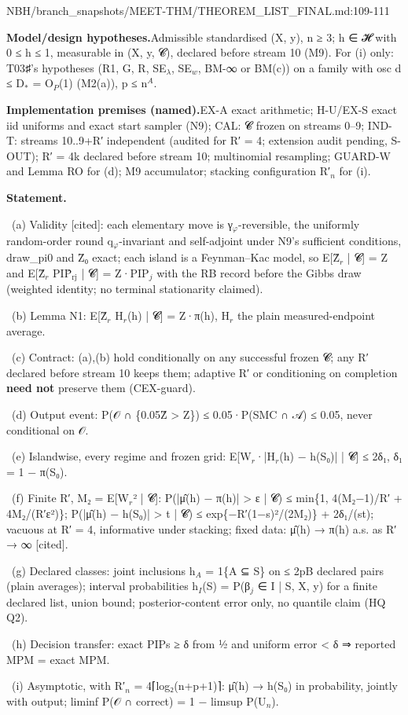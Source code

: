 \begin{stmt}{NBH/branch_snapshots/MEET-THM/THEOREM_LIST_FINAL.md:109-111}
\par\smallskip\noindent\textbf{Model/design hypotheses.}\enspace Admissible standardised (X, y), n ≥ 3; h ∈ 𝓗 with 0 ≤ h ≤ 1, measurable in (X, y, 𝓒), declared before stream 10 (M9). For (i) only: T03♯'s hypotheses (R1, G, R, SE$_{λ}$, SE$_{w}$, BM-∞ or BM(c)) on a family with osc d ≤ D$_{*}$ = O$_{P}$(1) (M2(a)), p ≤ n$^{A}$.
\par\smallskip\noindent\textbf{Implementation premises (named).}\enspace EX-A exact arithmetic; H-U/EX-S exact iid uniforms and exact start sampler (N9); CAL: 𝓒 frozen on streams 0–9; IND-T: streams 10..9+R′ independent (audited for R′ = 4; extension audit pending, S-OUT); R′ = 4k declared before stream 10; multinomial resampling; GUARD-W and Lemma RO for (d); M9 accumulator; stacking configuration R′$_{n}$ for (i).
\par\smallskip\noindent\textbf{Statement.}\enspace \par {}\ (a) Validity [cited]: each elementary move is γ$_{φ}$-reversible, the uniformly random-order round q$_{φ}$-invariant and self-adjoint under N9's sufficient conditions, draw\_pi0 and Z̄₀ exact; each island is a Feynman–Kac model, so E[Ẑ$_{r}$ | 𝓒] = Z and E[Ẑ$_{r}$ PIP̂$_{\mathrm{rj}}$ | 𝓒] = Z·PIP$_{j}$ with the RB record before the Gibbs draw (weighted identity; no terminal stationarity claimed). \par {}\ (b) Lemma N1: E[Ẑ$_{r}$ H$_{r}$(h) | 𝓒] = Z·π(h), H$_{r}$ the plain measured-endpoint average. \par {}\ (c) Contract: (a),(b) hold conditionally on any successful frozen 𝓒; any R′ declared before stream 10 keeps them; adaptive R′ or conditioning on completion \textbf{need not} preserve them (CEX-guard). \par {}\ (d) Output event: P(𝒪 ∩ \{0.05Ẑ \textgreater{} Z\}) ≤ 0.05·P(SMC ∩ 𝒜) ≤ 0.05, never conditional on 𝒪. \par {}\ (e) Islandwise, every regime and frozen grid: E[W$_{r}$·|H$_{r}$(h) − h(S₀)| | 𝓒] ≤ 2δ₁, δ₁ = 1 − π(S₀). \par {}\ (f) Finite R′, M₂ = E[W$_{r}$² | 𝓒]: P(|μ̂(h) − π(h)| \textgreater{} ε | 𝓒) ≤ min\{1, 4(M₂−1)/R′ + 4M₂/(R′ε²)\}; P(|μ̂(h) − h(S₀)| \textgreater{} t | 𝓒) ≤ exp\{−R′(1−s)²/(2M₂)\} + 2δ₁/(st); vacuous at R′ = 4, informative under stacking; fixed data: μ̂(h) → π(h) a.s. as R′ → ∞ [cited]. \par {}\ (g) Declared classes: joint inclusions h$_{A}$ = 1\{A ⊆ S\} on ≤ 2pB declared pairs (plain averages); interval probabilities h$_{I}$(S) = P(β$_{j}$ ∈ I | S, X, y) for a finite declared list, union bound; posterior-content error only, no quantile claim (HQ Q2). \par {}\ (h) Decision transfer: exact PIPs ≥ δ from ½ and uniform error \textless{} δ ⇒ reported MPM = exact MPM. \par {}\ (i) Asymptotic, with R′$_{n}$ = 4⌈log₂(n+p+1)⌉: μ̂(h) → h(S₀) in probability, jointly with output; liminf P(𝒪 ∩ correct) = 1 − limsup P(U$_{n}$).
\end{stmt}

